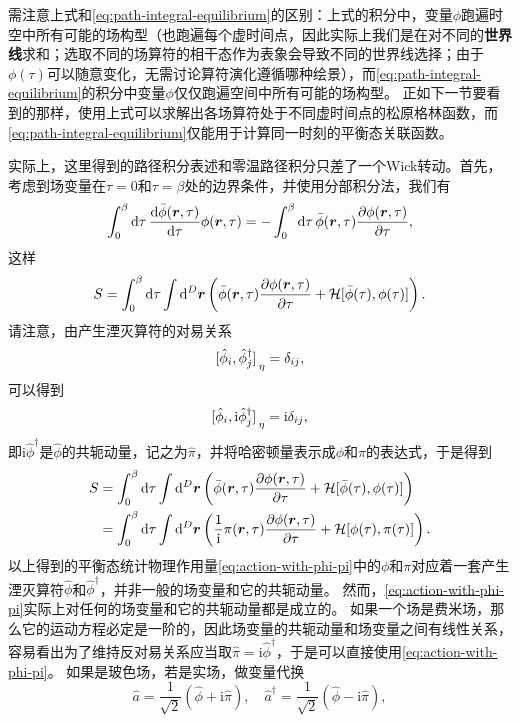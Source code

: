 \documentclass[hyperref, UTF8, a4paper]{ctexart}
\newcommand*{\ii}{\mathrm{i}}
\begin{document}
需注意上式和\eqref{eq:path-integral-equilibrium}的区别：上式的积分中，变量$\phi$跑遍时空中所有可能的场构型（也跑遍每个虚时间点，因此实际上我们是在对不同的\textbf{世界线}求和；选取不同的场算符的相干态作为表象会导致不同的世界线选择；由于$\phi(\tau)$可以随意变化，无需讨论算符演化遵循哪种绘景），而\eqref{eq:path-integral-equilibrium}的积分中变量$\phi$仅仅跑遍空间中所有可能的场构型。
正如下一节要看到的那样，使用上式可以求解出各场算符处于不同虚时间点的松原格林函数，而\eqref{eq:path-integral-equilibrium}仅能用于计算同一时刻的平衡态关联函数。

实际上，这里得到的路径积分表述和零温路径积分只差了一个Wick转动。首先，考虑到场变量在$\tau=0$和$\tau=\beta$处的边界条件，并使用分部积分法，我们有
\[
    \int_0^\beta \dd{\tau} \dv{\bar{\phi}(\vb*{r}, \tau)}{\tau} \phi(\vb*{r}, \tau) = - \int_0^\beta \dd{\tau} \bar{\phi}(\vb*{r}, \tau) \pdv{\phi(\vb*{r}, \tau)}{\tau},
\]
这样
\[
    S = \int_0^\beta \dd{\tau} \int \dd[D]{\vb*{r}} \left( \bar{\phi}(\vb*{r}, \tau) \pdv{\phi(\vb*{r}, \tau)}{\tau} + \mathcal{H}[\bar{\phi}(\tau), \phi(\tau)] \right).
\]
请注意，由产生湮灭算符的对易关系
\[
    \comm*{\hat{\phi}_i}{\hat{\phi}_j^\dagger}_\eta = \delta_{ij},
\]
可以得到
\[
    \comm*{\hat{\phi}_i}{\ii \hat{\phi}_j^\dagger}_\eta = \ii \delta_{ij},
\]
即$\ii \hat{\phi}^\dagger$是$\hat{\phi}$的共轭动量，记之为$\hat{\pi}$，并将哈密顿量表示成$\phi$和$\pi$的表达式，于是得到
\begin{equation}
    \begin{aligned}
        S &= \int_0^\beta \dd{\tau} \int \dd[D]{\vb*{r}} \left( \bar{\phi}(\vb*{r}, \tau) \pdv{\phi(\vb*{r}, \tau)}{\tau} + \mathcal{H}[\bar{\phi}(\tau), \phi(\tau)] \right) \\
        &= \int_0^\beta \dd{\tau} \int \dd[D]{\vb*{r}} \left( \frac{1}{\ii} \pi(\vb*{r}, \tau) \pdv{\phi(\vb*{r}, \tau)}{\tau} + \mathcal{H}[\phi(\tau), \pi(\tau)] \right).
    \end{aligned}
    \label{eq:action-with-phi-pi}
\end{equation}
以上得到的平衡态统计物理作用量\eqref{eq:action-with-phi-pi}中的$\phi$和$\pi$对应着一套产生湮灭算符$\hat{\phi}$和$\hat{\phi}^\dagger$，并非一般的场变量和它的共轭动量。
然而，\eqref{eq:action-with-phi-pi}实际上对任何的场变量和它的共轭动量都是成立的。
如果一个场是费米场，那么它的运动方程必定是一阶的，因此场变量的共轭动量和场变量之间有线性关系，容易看出为了维持反对易关系应当取$\hat{\pi} = \ii \hat{\phi}^\dagger$，于是可以直接使用\eqref{eq:action-with-phi-pi}。
如果是玻色场，若是实场，做变量代换
\[
    \hat{a} = \frac{1}{\sqrt{2}} (\hat{\phi} + \ii \hat{\pi}), \quad \hat{a}^\dagger = \frac{1}{\sqrt{2}} (\hat{\phi} - \ii \hat{\pi}),
\]
\end{document}
